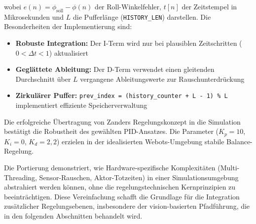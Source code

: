 wobei $e(n) = \phi_{\text{soll}} - \phi(n)$ der Roll-Winkelfehler, $t[n]$ der Zeitstempel in Mikrosekunden und $L$ die Pufferlänge (\texttt{HISTORY\_LEN}) darstellen. Die Besonderheiten der Implementierung sind:

\begin{itemize}
\item \textbf{Robuste Integration:} Der I-Term wird nur bei plausiblen Zeitschritten ($0 < \Delta t < 1$) aktualisiert
\item \textbf{Geglättete Ableitung:} Der D-Term verwendet einen gleitenden Durchschnitt über $L$ vergangene Ableitungswerte zur Rauschunterdrückung
\item \textbf{Zirkulärer Puffer:} \texttt{prev\_index = (history\_counter + L - 1) \% L} implementiert effiziente Speicherverwaltung
\end{itemize}

Die erfolgreiche Übertragung von Zanders Regelungskonzept in die Simulation bestätigt 
die Robustheit des gewählten PID-Ansatzes. Die Parameter (\(K_p = 10\), \(K_i = 0\), \(K_d = 2{,}2\)) erzielen 
in der idealisierten Webots-Umgebung stabile Balance-Regelung. 

Die Portierung demonstriert, wie Hardware-spezifische Komplexitäten (Multi-Threading, Sensor-Rauschen, Aktor-Totzeiten) in 
einer Simulationsumgebung abstrahiert werden können, ohne die regelungstechnischen Kernprinzipien zu beeinträchtigen. 
Diese Vereinfachung schafft die Grundlage für die Integration zusätzlicher Regelungsebenen, insbesondere der vision-basierten 
Pfadführung, die in den folgenden Abschnitten behandelt wird.


  
